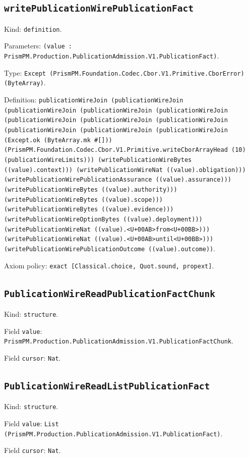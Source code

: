 \documentclass[11pt]{article}
\begin{document}
\subsection*{\texttt{writePublicationWirePublicationFact}}
\noindent Kind: \texttt{definition}.\par
\noindent Parameters: \texttt{(value : PrismPM.Production.PublicationAdmission.V1.PublicationFact)}.\par
\noindent Type: \texttt{Except (PrismPM.Foundation.Codec.Cbor.V1.Primitive.CborError) (ByteArray)}.\par
\noindent Definition: \texttt{publicationWireJoin (publicationWireJoin (publicationWireJoin (publicationWireJoin (publicationWireJoin (publicationWireJoin (publicationWireJoin (publicationWireJoin (publicationWireJoin (publicationWireJoin (publicationWireJoin (Except.ok (ByteArray.mk \#[])) (PrismPM.Foundation.Codec.Cbor.V1.Primitive.writeCborArrayHead (10) (publicationWireLimits))) (writePublicationWireBytes ((value).context))) (writePublicationWireNat ((value).obligation))) (writePublicationWirePublicationAssurance ((value).assurance))) (writePublicationWireBytes ((value).authority))) (writePublicationWireBytes ((value).scope))) (writePublicationWireBytes ((value).evidence))) (writePublicationWireOptionBytes ((value).deployment))) (writePublicationWireNat ((value).<U+00AB>from<U+00BB>))) (writePublicationWireNat ((value).<U+00AB>until<U+00BB>))) (writePublicationWirePublicationOutcome ((value).outcome))}.\par
\noindent Axiom policy: \texttt{exact [Classical.choice, Quot.sound, propext]}.\par
\subsection*{\texttt{PublicationWireReadPublicationFactChunk}}
\noindent Kind: \texttt{structure}.\par
\noindent Field \texttt{value}: \texttt{PrismPM.Production.PublicationAdmission.V1.PublicationFactChunk}.\par
\noindent Field \texttt{cursor}: \texttt{Nat}.\par
\subsection*{\texttt{PublicationWireReadListPublicationFact}}
\noindent Kind: \texttt{structure}.\par
\noindent Field \texttt{value}: \texttt{List (PrismPM.Production.PublicationAdmission.V1.PublicationFact)}.\par
\noindent Field \texttt{cursor}: \texttt{Nat}.\par
\end{document}
